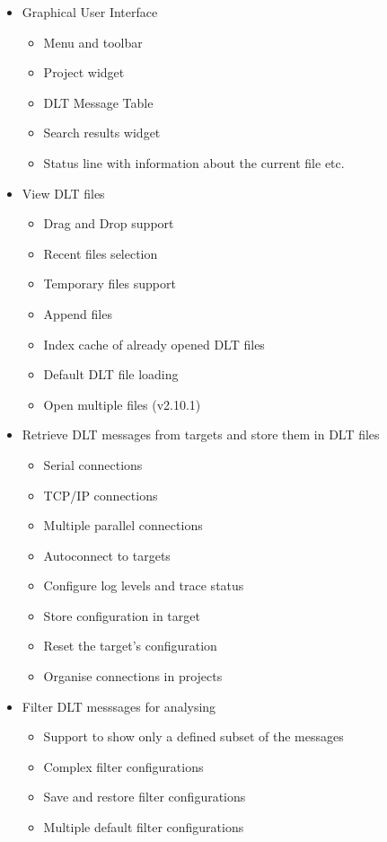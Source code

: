 \documentclass[a4paper,11pt]{article}
\begin{document}
\begin{itemize}
\item Graphical User Interface
  \begin{itemize}
    \item Menu and toolbar
    \item Project widget
    \item DLT Message Table
    \item Search results widget
    \item Status line with information about the current file etc.
  \end{itemize}
\item View DLT files
 \begin{itemize}
    \item Drag and Drop support
    \item Recent files selection
    \item Temporary files support
    \item Append files
    \item Index cache of already opened DLT files
    \item Default DLT file loading
    \item Open multiple files (v2.10.1)
 \end{itemize}
\item Retrieve DLT messages from targets and store them in DLT files
 \begin{itemize}
    \item Serial connections
    \item TCP/IP connections
    \item Multiple parallel connections
    \item Autoconnect to targets
    \item Configure log levels and trace status
    \item Store configuration in target
    \item Reset the target's configuration
    \item Organise connections in projects
 \end{itemize}
\item Filter DLT messsages for analysing
 \begin{itemize}
    \item Support to show only a defined subset of the messages
    \item Complex filter configurations
    \item Save and restore filter configurations
    \item Multiple default filter configurations

\end{itemize}
\end{itemize}
\end{document}
